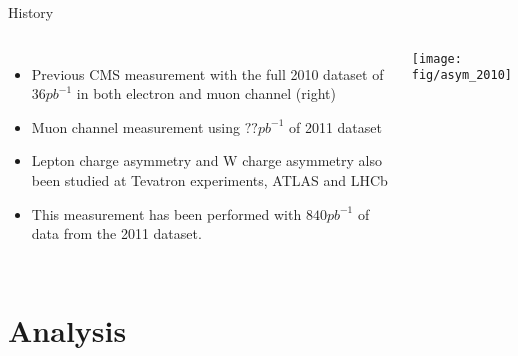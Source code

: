 \documentclass[t, 8pt]{beamer}
\begin{document}
\begin{frame}{History}
  \begin{columns}[c]
  \begin{itemize}
    \item Previous CMS measurement with the full 2010 dataset of $36 pb^{-1}$ in both electron and muon channel (right)
    \item Muon channel measurement using $??pb^{-1}$ of 2011 dataset
    \item Lepton charge asymmetry and W charge asymmetry also been studied at Tevatron experiments, ATLAS and LHCb
    \item This measurement has been performed with $840pb^{-1}$ of data from the 2011 dataset.
  \end{itemize}
    \texttt{[image: fig/asym\_2010]}
  \end{columns}
\end{frame}






\section{Analysis}
\end{document}
